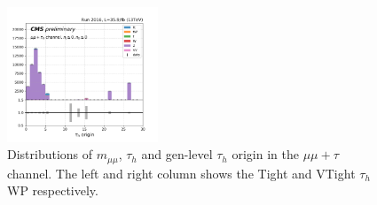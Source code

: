 \begin{figure}
    \includegraphics[width=0.4\textwidth]{chapters/Analysis/sectionCalibration/figures/jetToTauh/mumutau_tauGenFlavor_pickles_lltauVTight.png}
    \caption{Distributions of $m_{\mu\mu}$, $\tau_h$ \pt and gen-level $\tau_h$ origin in the $\mu\mu+\tau$ channel. The left and right column shows the Tight and VTight $\tau_h$ WP respectively.}
    \label{fig:appendix:fakeTauId:mumutau}
\end{figure}



